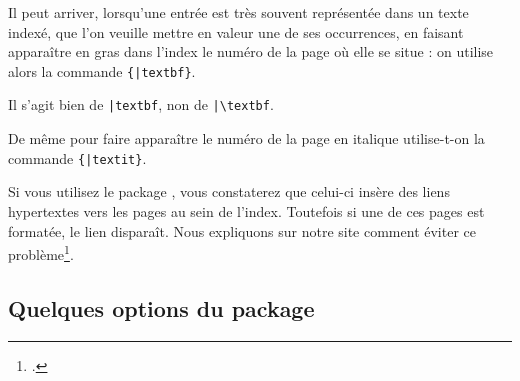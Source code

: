 Il peut arriver, lorsqu'une entrée est très souvent représentée dans un texte indexé, que l'on veuille mettre en valeur une de ses occurrences, en faisant apparaître en gras dans l'index le numéro de la page où elle se situe : on utilise alors la commande \verb|{|\verb+|textbf}+. 

\begin{attention}
Il s'agit bien de \verb+|textbf+, non de \verb+|\textbf+.
\end{attention}

De même pour faire apparaître le numéro de la page en italique utilise-t-on la commande \verb|{|\verb+|textit}+.





\begin{plusloins}
Si vous utilisez le package , vous constaterez que celui-ci insère des liens hypertextes vers les pages au sein de l'index. Toutefois si une de ces pages est formatée, le lien disparaît. Nous expliquons sur notre site comment éviter ce problème\footcite{indexhypergras}.
\end{plusloins}


\subsection{Quelques options du package }



